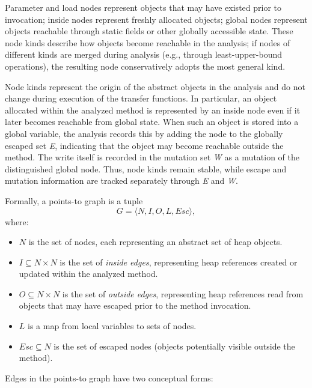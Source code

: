 \documentclass{article}
\begin{document}
\noindent Parameter and load nodes represent objects that may have existed prior to invocation; inside nodes represent freshly allocated objects; global nodes represent objects reachable through static fields or other globally accessible state. These node kinds describe how objects become reachable in the analysis; if nodes of different kinds are merged during analysis (e.g., through least-upper-bound operations), the resulting node conservatively adopts the most general kind.

Node kinds represent the origin of the abstract objects in the analysis and do not change during execution of the transfer functions. In particular, an object allocated within the analyzed method is represented by an inside node even if it later becomes reachable from global state. When such an object is stored into a global variable, the analysis records this by adding the node to the globally escaped set \emph{E}, indicating that the object may become reachable outside the method. The write itself is recorded in the mutation set \emph{W} as a mutation of the distinguished global node. Thus, node kinds remain stable, while escape and mutation information are tracked separately through \emph{E} and \emph{W}. \newline

\noindent Formally, a points-to graph is a tuple
\[
G = \langle N, I, O, L, Esc \rangle,
\]
where:

\begin{itemize}
    \item $N$ is the set of nodes, each representing an abstract set of heap objects.

    \item $I \subseteq N \times N$ is the set of \emph{inside edges}, representing heap references created or updated within the analyzed method.

    \item $O \subseteq N \times N$ is the set of \emph{outside edges}, representing heap references read from objects that may have escaped prior to the method invocation.

    \item $L$ is a map from local variables to sets of nodes.

    \item $Esc \subseteq N$ is the set of escaped nodes (objects potentially visible outside the method).
\end{itemize}

Edges in the points-to graph have two conceptual forms:
\end{document}
